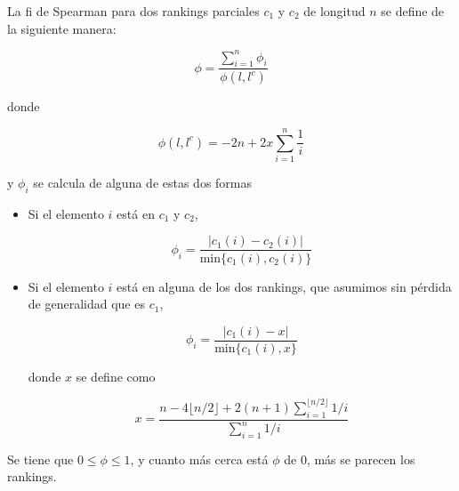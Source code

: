 \begin{defi}
La fi de Spearman para dos rankings parciales $c_1$ y $c_2$ de longitud $n$ se define de la siguiente manera:

\begin{equation}
\phi = \dfrac{\sum\limits_{i=1}^{n} \phi_i}{\phi(l, l^c)}
\end{equation} 

donde 

\begin{equation}
\phi(l, l^c) = -2n + 2x\sum\limits_{i=1}^{n} \dfrac{1}{i}
\end{equation}

y $\phi_i$ se calcula de alguna de estas dos formas

\begin{itemize}
\item Si el elemento $i$ está en $c_1$ y $c_2$,

\begin{equation}
\phi_i = \dfrac{|c_1(i) - c_2(i)|}{\mathrm{min}\{c_1(i), c_2(i)\}}
\end{equation}

\item Si el elemento $i$ está en alguna de los dos rankings, que asumimos sin pérdida de generalidad que es $c_1$,


\begin{equation}
\phi_i = \dfrac{|c_1(i) - x|}{\mathrm{min}\{c_1(i), x\}}
\end{equation} 

donde $x$ se define como

\begin{equation}
x = \dfrac{n - 4 \lfloor n/2\rfloor + 2(n+1) \sum_{i=1}^{\lfloor n/2\rfloor} 1/i}{\sum_{i=1}^{n} 1/i}
\end{equation}
\end{itemize}
\end{defi}

Se tiene que $0 \leq \phi \leq 1$, y cuanto más cerca está $\phi$ de $0$, más se parecen los rankings.

